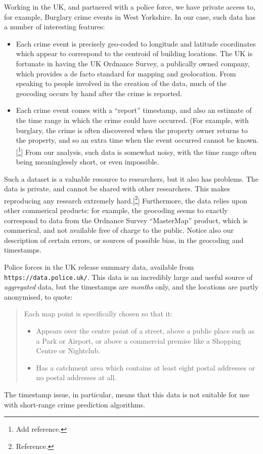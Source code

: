 \documentclass[twoside,a4paper,twocolumn,10pt]{article}
\theoremstyle{plain}
\theoremstyle{definition}
\begin{document}
Working in the UK, and partnered with a police force, we have private access to,
for example, Burglary crime events in West Yorkshire.  In our case, such data has a
number of interesting features:
\begin{itemize}
\item Each crime event is precisely geo-coded to longitude and latitude coordinates
  which appear to correspond to the centroid of building locations.  The UK is fortunate
  in having the UK Ordnance Survey, a publically owned company, which provides a de facto
  standard for mapping and geolocation.  From speaking to people involved in the creation
  of the data, much of the geocoding occurs by hand after the crime is reported.
\item Each crime event comes with a ``report'' timestamp, and also an estimate of the
  time range in which the crime could have occurred.  (For example, with burglary, the
  crime is often discovered when the property owner returns to the property, and so an
  extra time when the event occurred cannot be known.[\footnote{Add reference.}]
  From our analysis, such data is somewhat noisy, with the time range often being meaninglessly
  short, or even impossible.
\end{itemize}
Such a dataset is a valuable resource to researchers, but it also has problems.  The data
is private, and cannot be shared with other researchers.  This makes reproducing any
research extremely hard.[\footnote{Reference.}]  Furthermore, the data relies upon other
commerical products: for example, the geocoding seems to exactly correspond to data
from the Ordnance Survey ``MasterMap'' product, which is commerical, and not available
free of charge to the public.  Notice also our description of certain errors, or sources of
possible bias, in the geocoding and timestamps.

Police forces in the UK release summary data, available from \texttt{https://data.police.uk/}.
This data is an incredibly large and useful source of \emph{aggregated} data, but the timestamps
are \emph{months} only, and the locations are partly anonymised, to quote:
\begin{quote}
Each map point is specifically chosen so that it:
\begin{itemize}
\item Appears over the centre point of a street, above a public place such as a Park or Airport, or
  above a commercial premise like a Shopping Centre or Nightclub.
\item Has a catchment area which contains at least eight postal addresses or no postal addresses at all.
\end{itemize}
\end{quote}
The timestamp issue, in particular, means that this data is not suitable for use with
short-range crime prediction algorithms.
\end{document}
